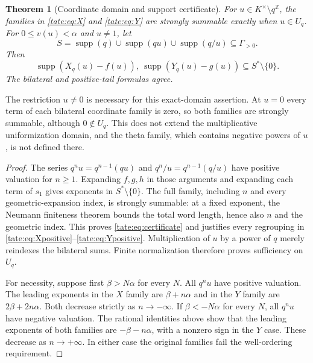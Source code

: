 \documentclass[11pt,letterpaper]{article}
\newtheorem{theorem}{Theorem}[section]
\theoremstyle{definition}
\newcommand{\Z}{\mathbb Z}
\newcommand{\supp}{\operatorname{supp}}
\begin{document}
\begin{theorem}[Coordinate domain and support certificate]\label{tate:thm:coordinates}
For $u\in K^\times\setminus q^\Z$, the families in \eqref{tate:eq:X} and \eqref{tate:eq:Y} are
strongly summable exactly when $u\in U_q$.
For $0\le v(u)<\alpha$ and $u\ne1$, let
\begin{equation}
 S=\supp(q)\cup\supp(qu)\cup\supp(q/u)\subseteq\Gamma_{>0}.
 \label{tate:eq:S}
\end{equation}
Then
\begin{equation}
 \supp(X_q(u)-f(u)),\ \supp(Y_q(u)-g(u))
        \subseteq S^*\setminus\{0\}.\label{tate:eq:certificate}
\end{equation}
The bilateral and positive-tail formulas agree.
\end{theorem}

The restriction $u\ne0$ is necessary for this exact-domain assertion.
At $u=0$ every term of each bilateral coordinate family is zero, so both
families are strongly summable, although $0\notin U_q$. This does not
extend the multiplicative uniformization domain, and the theta family,
which contains negative powers of $u$, is not defined there.

\begin{proof}
The series $q^nu=q^{n-1}(qu)$ and $q^n/u=q^{n-1}(q/u)$ have positive
valuation for $n\ge1$. Expanding $f,g,h$ in those arguments and
expanding each term of $s_1$ gives exponents in $S^*\setminus\{0\}$.
The full family, including $n$ and every geometric-expansion index, is
strongly summable: at a fixed exponent, the Neumann finiteness theorem
bounds the total word length, hence also $n$ and the geometric index.
This proves \eqref{tate:eq:certificate} and justifies every regrouping in
\eqref{tate:eq:Xpositive}--\eqref{tate:eq:Ypositive}. Multiplication of $u$ by a
power of $q$ merely reindexes the bilateral sums. Finite normalization
therefore proves sufficiency on $U_q$.

For necessity, suppose first $\beta>N\alpha$ for every $N$. All $q^nu$
have positive valuation. The leading exponents in the $X$ family are
$\beta+n\alpha$ and in the $Y$ family are $2\beta+2n\alpha$.
Both decrease strictly as $n\to-\infty$. If $\beta<-N\alpha$ for every
$N$, all $q^nu$ have negative valuation. The rational identities above
show that the leading exponents of both families are
$-\beta-n\alpha$, with a nonzero sign in the $Y$ case. These decrease
as $n\to+\infty$. In either case the original families fail the
well-ordering requirement.
\end{proof}
\end{document}
